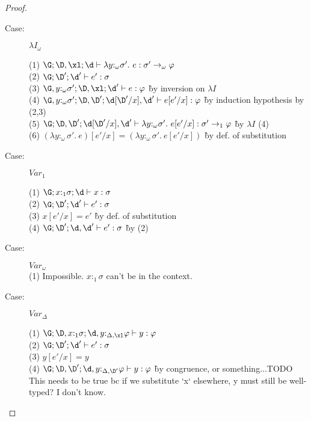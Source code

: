 \begin{proof}
\begin{description}
\item[Case:] $\lambda I_\omega$
\begin{tabbing}
  (1) $\G; \D, \xl; \d \vdash \lambda y{:}_\omega\sigma'.~e : \sigma' \to_\omega \varphi$\\
  (2) $\G; \D'; \d' \vdash e' : \sigma$\\
  (3) $\G, y{:}_\omega\sigma'; \D, \xl; \d' \vdash e : \varphi$ \` by inversion on $\lambda I$\\
  (4) $\G, y{:}_\omega\sigma'; \D, \D'; \d[\D'/x], \d' \vdash e[e'/x] : \varphi$ \` by induction hypothesis by (2,3)\\
  (5) $\G; \D,\D'; \d[\D'/x],\d' \vdash \lambda y{:}_\omega\sigma'.~e[e'/x] : \sigma' \to_1 \varphi$ \` by $\lambda I$ (4)\\
  (6) $(\lambda y{:}_\omega\sigma'.~e)[e'/x] = (\lambda y{:}_\omega\sigma'.~e[e'/x])$ \` by def. of substitution\\
\end{tabbing}

\item[Case:] $Var_1$
\begin{tabbing}
  (1) $\G;x{:}_1\sigma;\d \vdash x : \sigma$\\
  (2) $\G;\D';\d' \vdash e' : \sigma$\\
  (3) $x[e'/x] = e'$ \` by def. of substitution\\
    (4) $\G;\D';\d,\d' \vdash e' : \sigma$ \` by (2)\\ %
\end{tabbing}

\item[Case:] $Var_\omega$\\
  (1) Impossible. $x{:}_1\sigma$ can't be in the context.\\

\item[Case:] $Var_\Delta$
\begin{tabbing}
  (1) $\G; \D, x{:}_1\sigma; \d,y{:}_{\Delta,\xl}\varphi \vdash y : \varphi$\\
  (2) $\G; \D'; \d' \vdash e' : \sigma$\\
  (3) $y[e'/x] = y$\\
  (4) $\G; \D,\D'; \d,y{:}_{\Delta,\D'}\varphi \vdash y : \varphi$ \` by congruence, or something...TODO\\
  This needs to be true bc if we substitute `x` elsewhere, y must still be well-typed? I don't know.
\end{tabbing}


\end{description}
\end{proof}

